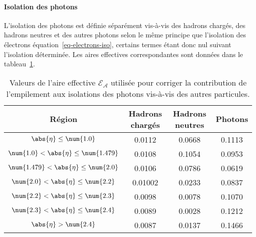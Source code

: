 \paragraph{Isolation des photons}
L'isolation des photons est définie séparément vis-à-vis
des hadrons chargés,
des hadrons neutres et
des autres photons
selon le même principe que l'isolation des électrons équation~\eqref{eq-electrons-iso}, certains termes étant donc nul suivant l'isolation déterminée.
Les aires effectives correspondantes sont données dans le tableau~\ref{tab-photon-effective_areas}.
\begin{table}[h]
\centering
\begin{tabular}{cccc}
\toprule
Région & Hadrons chargés & Hadrons neutres & Photons \\
\midrule
$\abs{\eta} \leq \num{1.0}$ & \num{0.0112} & \num{0.0668} & \num{0.1113} \\
$\num{1.0} < \abs{\eta} \leq \num{1.479}$ & \num{0.0108} & \num{0.1054} & \num{0.0953} \\
$\num{1.479} < \abs{\eta} \leq \num{2.0}$ & \num{0.0106} & \num{0.0786} & \num{0.0619} \\
$\num{2.0} < \abs{\eta} \leq \num{2.2}$ & \num{0.01002} & \num{0.0233} & \num{0.0837} \\
$\num{2.2} < \abs{\eta} \leq \num{2.3}$ & \num{0.0098} & \num{0.0078} & \num{0.1070} \\
$\num{2.3} < \abs{\eta} \leq \num{2.4}$ & \num{0.0089} & \num{0.0028} & \num{0.1212} \\
$\abs{\eta} > \num{2.4}$ & \num{0.0087} & \num{0.0137} & \num{0.1466} \\
\bottomrule
\end{tabular}
\caption[Aires effectives de correction de l'isolation du photon.]{Valeurs de l'aire effective $\mathcal{E_A}$ utilisée pour corriger la contribution de l'empilement aux isolations des photons vis-à-vis des autres particules.}
\label{tab-photon-effective_areas}
\end{table}
